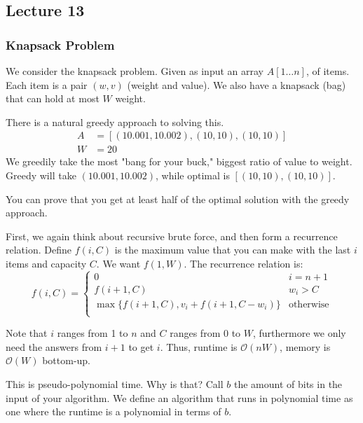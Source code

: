 \subsection{Lecture 13}
\subsubsection{Knapsack Problem}
We consider the knapsack problem. Given as input an array $A[1 \dots n]$, of items.
Each item is a pair $(w, v)$ (weight and value). We also have a knapsack (bag) that can hold at most $W$ weight.

\begin{example}
There is a natural greedy approach to solving this.
\begin{align*}
    A &= [(10.001, 10.002), (10, 10), (10, 10)] \\
    W &= 20
\end{align*}
We greedily take the most "bang for your buck," biggest ratio of value to weight.
Greedy will take $(10.001, 10.002)$, while optimal is $[(10, 10), (10, 10)]$.

You can prove that you get at least half of the optimal solution with the greedy approach.
\end{example}


\begin{algothm} [Knapsack DP]
    First, we again think about recursive brute force, and then form a recurrence relation. Define $f(i, C)$ is
    the maximum value that you can make with the last $i$ items and capacity $C$. We want $f(1, W)$.
    The recurrence relation is:
    \[ f(i, C) = \begin{cases}
        0 & i = n + 1 \\
        f(i + 1, C) & w_i > C \\
        \max\{f(i + 1, C), v_i + f(i + 1, C - w_i)\} & \text{otherwise} \\
    \end{cases}\]

    Note that $i$ ranges from 1 to $n$ and $C$ ranges from $0$ to $W$, furthermore we only need the answers from $i + 1$ to get $i$. Thus,
    runtime is $\mathcal{O}(nW)$, memory is $\mathcal{O}(W)$ bottom-up.
\end{algothm}

This is pseudo-polynomial time. Why is that? Call $b$ the amount of bits in the input of your algorithm.
We define an algorithm that runs in polynomial time as one where the runtime is a polynomial in terms of $b$.

